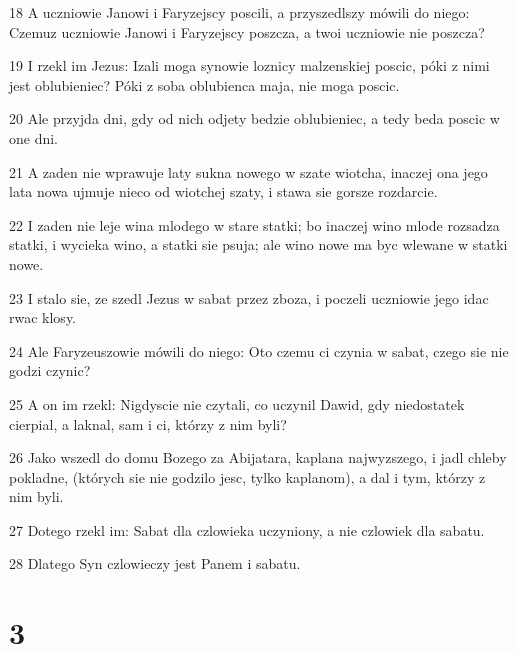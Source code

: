 \par 18 A uczniowie Janowi i Faryzejscy poscili, a przyszedlszy mówili do niego: Czemuz uczniowie Janowi i Faryzejscy poszcza, a twoi uczniowie nie poszcza?
\par 19 I rzekl im Jezus: Izali moga synowie loznicy malzenskiej poscic, póki z nimi jest oblubieniec? Póki z soba oblubienca maja, nie moga poscic.
\par 20 Ale przyjda dni, gdy od nich odjety bedzie oblubieniec, a tedy beda poscic w one dni.
\par 21 A zaden nie wprawuje laty sukna nowego w szate wiotcha, inaczej ona jego lata nowa ujmuje nieco od wiotchej szaty, i stawa sie gorsze rozdarcie.
\par 22 I zaden nie leje wina mlodego w stare statki; bo inaczej wino mlode rozsadza statki, i wycieka wino, a statki sie psuja; ale wino nowe ma byc wlewane w statki nowe.
\par 23 I stalo sie, ze szedl Jezus w sabat przez zboza, i poczeli uczniowie jego idac rwac klosy.
\par 24 Ale Faryzeuszowie mówili do niego: Oto czemu ci czynia w sabat, czego sie nie godzi czynic?
\par 25 A on im rzekl: Nigdyscie nie czytali, co uczynil Dawid, gdy niedostatek cierpial, a laknal, sam i ci, którzy z nim byli?
\par 26 Jako wszedl do domu Bozego za Abijatara, kaplana najwyzszego, i jadl chleby pokladne, (których sie nie godzilo jesc, tylko kaplanom), a dal i tym, którzy z nim byli.
\par 27 Dotego rzekl im: Sabat dla czlowieka uczyniony, a nie czlowiek dla sabatu.
\par 28 Dlatego Syn czlowieczy jest Panem i sabatu.

\chapter{3}


